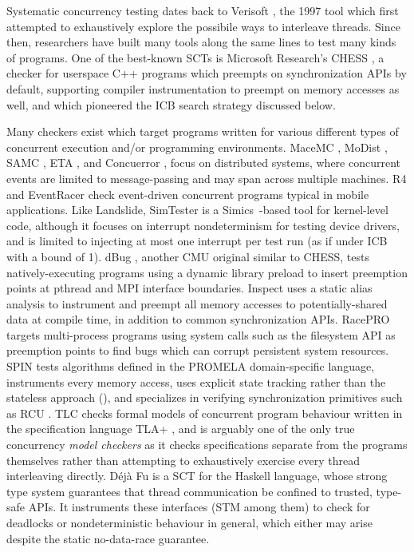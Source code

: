 Systematic concurrency testing dates back to Verisoft \cite{verisoft},
the 1997 tool which first attempted to exhaustively explore the possibile ways to interleave threads.
Since then, researchers have built many tools along the same lines to test many kinds of programs.
One of the best-known SCTs is Microsoft Research's CHESS \cite{chess},
a checker for userspace C++ programs which preempts on synchronization APIs by default,
supporting compiler instrumentation to preempt on memory accesses as well,
and which pioneered the ICB search strategy discussed below.

Many checkers exist which target programs written for various different types of
concurrent execution and/or programming environments.
MaceMC \cite{macemc}, MoDist \cite{modist}, SAMC \cite{samc}, ETA \cite{dbug-retreat}, and Concuerror \cite{concuerror},
focus on distributed systems, where concurrent events are limited to message-passing and may span across multiple machines.
R4 \cite{r4} and EventRacer \cite{eventracer} check event-driven concurrent programs typical in mobile applications.
Like Landslide, SimTester \cite{simtester} is a Simics~\cite{simics}-based tool for kernel-level code,
although it focuses on interrupt nondeterminism for testing device drivers,
and is limited to injecting at most one interrupt per test run (as if under ICB with a bound of 1).
%
dBug \cite{dbug-ssv}, another CMU original similar to CHESS,
tests natively-executing programs
using a dynamic library preload to insert preemption points at pthread and MPI interface boundaries.
Inspect \cite{inspect} uses a static alias analysis to instrument and preempt all memory accesses to potentially-shared data
at compile time, in addition to common synchronization APIs.
RacePRO~\cite{racepro} targets multi-process programs using system calls such as the filesystem API as preemption points
to find bugs which can corrupt persistent system resources.
SPIN \cite{spin} tests algorithms defined in the PROMELA domain-specific language,
instruments every memory access,
uses explicit state tracking rather than the stateless approach (\sect{\ref{sec:overview-stateless}}),
and specializes in verifying synchronization primitives such as RCU \cite{rcu}.
TLC \cite{tlc} checks formal models of concurrent program behaviour
written in the specification language TLA+ \cite{tlaplus},
and is arguably one of the only true concurrency {\em model checkers}
as it checks specifications separate from the programs themselves
rather than attempting to exhaustively exercise every thread interleaving directly.
%
D\'{e}j\`{a} Fu \cite{dejafu} is a SCT
for the Haskell language,
whose strong type system guarantees that thread communication be confined to trusted, type-safe APIs.
It instruments these interfaces (STM among them)
to check for deadlocks or nondeterministic behaviour in general,
which either may arise despite the static no-data-race guarantee.

